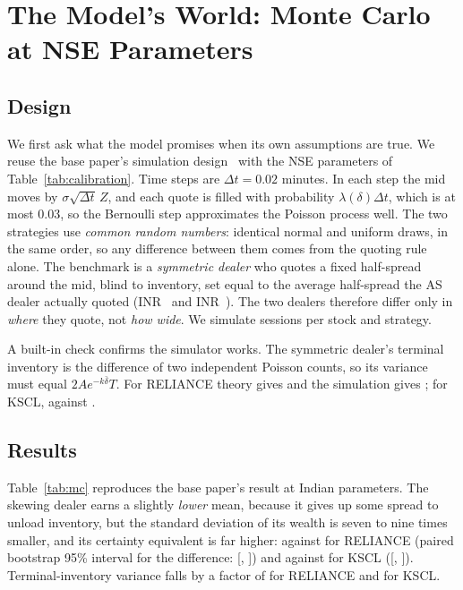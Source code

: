\section{The Model's World: Monte Carlo at NSE Parameters}
\label{sec:mc}

\subsection{Design}

We first ask what the model promises when its own assumptions are true. We reuse the base paper's
simulation design~\cite{amargos2026} with the NSE parameters of Table~\ref{tab:calibration}. Time
steps are $\Delta t=0.02$ minutes. In each step the mid moves by $\sigma\sqrt{\Delta t}\,Z$, and each
quote is filled with probability $\lambda(\delta)\Delta t$, which is at most 0.03, so the
Bernoulli step approximates the Poisson process well. The two strategies use \emph{common random
numbers}: identical normal and uniform draws, in the same order, so any difference between them comes
from the quoting rule alone. The benchmark is a \emph{symmetric dealer} who quotes a fixed
half-spread around the mid, blind to inventory, set equal to the average half-spread the AS dealer
actually quoted (\textrm{INR}~\RELIANCEHalfSpread{} and \textrm{INR}~\KSCLHalfSpread{}). The two
dealers therefore differ only in \emph{where} they quote, not \emph{how wide}. We simulate
\Paths{} sessions per stock and strategy.

A built-in check confirms the simulator works. The symmetric dealer's terminal inventory is the
difference of two independent Poisson counts, so its variance must equal $2Ae^{-k\bar\delta}T$. For
RELIANCE theory gives \RELIANCEVarqTheory{} and the simulation gives \RELIANCEVarqSym{}; for KSCL,
\KSCLVarqTheory{} against \KSCLVarqSym{}.

\begin{table}[!htbp]
\centering
\caption{Monte Carlo results, \Paths{} sessions per row, $\gamma=\GammaRA$. CE is the certainty
equivalent $-\frac1\gamma\ln\mathbb{E}[e^{-\gamma W_T}]$, the sure amount the dealer values the
strategy at. All amounts in rupees per session.}
\label{tab:mc}
\small

\end{table}

\subsection{Results}

Table~\ref{tab:mc} reproduces the base paper's result at Indian parameters. The skewing dealer
earns a slightly \emph{lower} mean, because it gives up some spread to unload inventory, but the standard deviation of
its wealth is seven to nine times smaller, and its certainty equivalent is far higher:
\RELIANCECEAS{} against \RELIANCECESym{} for RELIANCE (paired bootstrap 95\% interval for the
difference: [\RELIANCECEciLo, \RELIANCECEciHi]) and \KSCLCEAS{} against \KSCLCESym{} for KSCL
([\KSCLCEciLo, \KSCLCEciHi]). Terminal-inventory variance falls by a factor of
\RELIANCEVarqFactor{} for RELIANCE and \KSCLVarqFactor{} for KSCL.

